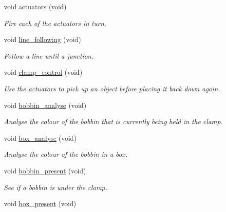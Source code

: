 \begin{DoxyCompactItemize}
void \hyperlink{classIDP_1_1SelfTests_a0ca765ac144fafaab502f4326a480486}{actuators} (void)
\begin{DoxyCompactList}\small\item\em Fire each of the actuators in turn. \item\end{DoxyCompactList}\item 
void \hyperlink{classIDP_1_1SelfTests_a0a1a40b56fee5249def567bebdb05dc1}{line\_\-following} (void)
\begin{DoxyCompactList}\small\item\em Follow a line until a junction. \item\end{DoxyCompactList}\item 
void \hyperlink{classIDP_1_1SelfTests_a896204355ca039660a12e8131578b6c3}{clamp\_\-control} (void)
\begin{DoxyCompactList}\small\item\em Use the actuators to pick up an object before placing it back down again. \item\end{DoxyCompactList}\item 
void \hyperlink{classIDP_1_1SelfTests_a66f0a3bad277e36b963b2bf3cd5df9dd}{bobbin\_\-analyse} (void)
\begin{DoxyCompactList}\small\item\em Analyse the colour of the bobbin that is currently being held in the clamp. \item\end{DoxyCompactList}\item 
void \hyperlink{classIDP_1_1SelfTests_ad112f0e0a9ef078b394585742d23fbbf}{box\_\-analyse} (void)
\begin{DoxyCompactList}\small\item\em Analyse the colour of the bobbin in a box. \item\end{DoxyCompactList}\item 
void \hyperlink{classIDP_1_1SelfTests_a9914eb4c83e3613311d1b4656631db01}{bobbin\_\-present} (void)
\begin{DoxyCompactList}\small\item\em See if a bobbin is under the clamp. \item\end{DoxyCompactList}\item 
void \hyperlink{classIDP_1_1SelfTests_a04ec400b90a5fa3203db667aa97ec99d}{box\_\-present} (void)

\end{DoxyCompactItemize}
